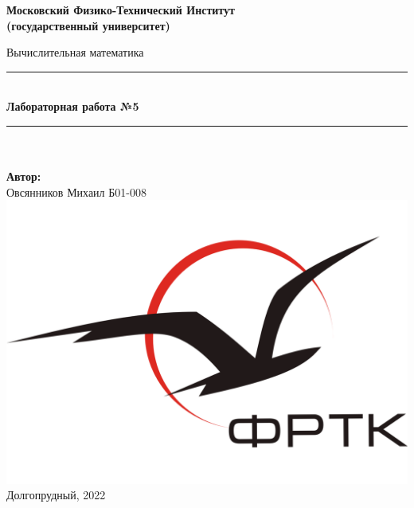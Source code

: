 \newcommand{\HRule}{\rule{\linewidth}{0.7mm}} %

\begin{center}
	\large\textbf{Московский Физико-Технический Институт}\\
	\large\textbf{(государственный университет)}
	
	\vfill
	

	
	\Large Вычислительная математика
	
	\HRule
	\\[0.4cm]
	{ \huge \bfseries Лабораторная работа №5}
	\\[0.4cm] %
	\HRule
	\\[0.5cm]
	
	\ \\
	\textbf{\large Автор:} \\	
	\large Овсянников Михаил Б01-008\\
	\vfill
	\hspace*{-0.8 cm}\includegraphics[width=100 pt]{./Include/frkt_logo.pdf}\\
	\large Долгопрудный, 2022
\end{center}

\thispagestyle{empty}

\newpage
\setcounter{page}{2}
\fancyfoot[c]{\thepage}
\fancyhead[R]{}
